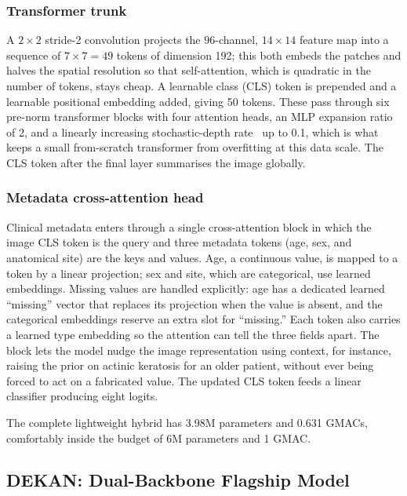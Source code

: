\subsubsection{Transformer trunk}

A $2\times2$ stride-2 convolution projects the $96$-channel, $14\times14$ feature
map into a sequence of $7\times7 = 49$ tokens of dimension 192; this both embeds
the patches and halves the spatial resolution so that self-attention, which is
quadratic in the number of tokens, stays cheap. A learnable class (CLS) token is
prepended and a learnable positional embedding added, giving 50 tokens. These
pass through six pre-norm transformer blocks with four attention heads, an MLP
expansion ratio of 2, and a linearly increasing stochastic-depth
rate~\cite{huang2016stochasticdepth} up to 0.1, which is what keeps a small
from-scratch transformer from overfitting at this data scale. The CLS token after
the final layer summarises the image globally.

\subsubsection{Metadata cross-attention head}

Clinical metadata enters through a single cross-attention block in which the
image CLS token is the query and three metadata tokens (age, sex, and
anatomical site) are the keys and values. Age, a continuous value, is mapped
to a token by a linear projection; sex and site, which are categorical, use
learned embeddings. Missing values are handled explicitly: age has a dedicated
learned ``missing'' vector that replaces its projection when the value is absent,
and the categorical embeddings reserve an extra slot for ``missing.'' Each token
also carries a learned type embedding so the attention can tell the three fields
apart. The block lets the model nudge the image representation using context,
for instance, raising the prior on actinic keratosis for an older patient,
without ever being forced to act on a fabricated value. The updated CLS token
feeds a linear classifier producing eight logits.

The complete lightweight hybrid has 3.98M parameters and 0.631 GMACs, comfortably
inside the budget of 6M parameters and 1 GMAC.

\subsection{DEKAN: Dual-Backbone Flagship Model}

